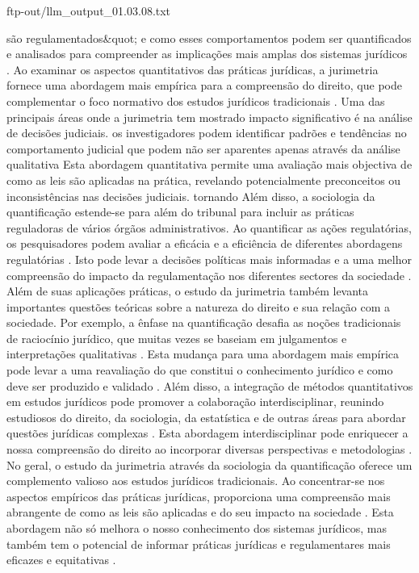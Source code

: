 ftp-out/llm_output_01.03.08.txt 

são regulamentados&quot; e como esses comportamentos podem ser quantificados e analisados para compreender as implicações mais amplas dos sistemas jurídicos \cite{smith2020jurimetrics}. Ao examinar os aspectos quantitativos das práticas jurídicas, a jurimetria fornece uma abordagem mais empírica para a compreensão do direito, que pode complementar o foco normativo dos estudos jurídicos tradicionais \cite{johnson2019sociologia}. Uma das principais áreas onde a jurimetria tem mostrado impacto significativo é na análise de decisões judiciais. os investigadores podem identificar padrões e tendências no comportamento judicial que podem não ser aparentes apenas através da análise qualitativa \cite{lee2018judicial} Esta abordagem quantitativa permite uma avaliação mais objectiva de como as leis são aplicadas na prática, revelando potencialmente preconceitos ou inconsistências nas decisões judiciais. tornando \cite{miller2017quantitativo} Além disso, a sociologia da quantificação estende-se para além do tribunal para incluir as práticas reguladoras de vários órgãos administrativos. Ao quantificar as ações regulatórias, os pesquisadores podem avaliar a eficácia e a eficiência de diferentes abordagens regulatórias \cite{brown2016regulation}. Isto pode levar a decisões políticas mais informadas e a uma melhor compreensão do impacto da regulamentação nos diferentes sectores da sociedade \cite{wilson2015policy}. Além de suas aplicações práticas, o estudo da jurimetria também levanta importantes questões teóricas sobre a natureza do direito e sua relação com a sociedade. Por exemplo, a ênfase na quantificação desafia as noções tradicionais de raciocínio jurídico, que muitas vezes se baseiam em julgamentos e interpretações qualitativas \cite{adams2014legal}. Esta mudança para uma abordagem mais empírica pode levar a uma reavaliação do que constitui o conhecimento jurídico e como deve ser produzido e validado \cite{thompson2013knowledge}. Além disso, a integração de métodos quantitativos em estudos jurídicos pode promover a colaboração interdisciplinar, reunindo estudiosos do direito, da sociologia, da estatística e de outras áreas para abordar questões jurídicas complexas \cite{green2012interdisciplinary}. Esta abordagem interdisciplinar pode enriquecer a nossa compreensão do direito ao incorporar diversas perspectivas e metodologias \cite{white2011diverse}. No geral, o estudo da jurimetria através da sociologia da quantificação oferece um complemento valioso aos estudos jurídicos tradicionais. Ao concentrar-se nos aspectos empíricos das práticas jurídicas, proporciona uma compreensão mais abrangente de como as leis são aplicadas e do seu impacto na sociedade \cite{black2010comprehensive}. Esta abordagem não só melhora o nosso conhecimento dos sistemas jurídicos, mas também tem o potencial de informar práticas jurídicas e regulamentares mais eficazes e equitativas \cite{clark2009efficient}. 

